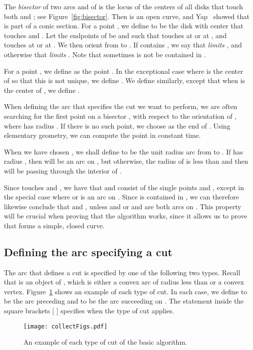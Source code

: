 \documentclass{article}
\begin{document}
The \emph{bisector}  of two arcs  and  of  is the locus of the centers of all disks that touch both  and ; see Figure~\ref{fig:bisector}.
Then  is an open curve, and Yap~\cite{yap1987ano} showed that  is part of a conic section.
For a point , we define  to be the disk with center  that touches  and .
Let the endpoints of  be  and  such that  touches  at  or  at , and  touches  at  or  at .
We then orient  from  to .
If  contains , we say that  \emph{limits} , and otherwise that  \emph{limits} .
Note that sometimes  is not be contained in .

For a point , we define  as the point .
In the exceptional case where  is the center of  so that this is not unique, we define .
We define  similarly, except that when  is the center of , we define .

When defining the arc  that specifies the cut we want to perform, we are often searching for the first point  on a bisector , with respect to the orientation of , where  has radius .
If there is no such point, we choose  as the end of .
Using elementary geometry, we can compute the point  in constant time.

When we have chosen , we shall define  to be the unit radius arc from  to .
If  has radius , then  will be an arc on , but otherwise, the radius of  is less than  and then  will be passing through the interior of .

Since  touches  and , we have that  and  consist of the single points  and , except in the special case where  or  is an arc on .
Since  is contained in , we can therefore likewise conclude that  and , unless  and  or  and  are both arcs on .
This property will be crucial when proving that the algorithm works, since it allows us to prove that  forms a simple, closed curve.

\subsection{Defining the arc  specifying a cut}\label{cutDef}

The arc  that defines a cut is specified by one of the following two types.
Recall that  is an object of , which is either a convex arc of radius less than  or a convex vertex. 
Figure~\ref{fig:cuttypesSimple} shows an example of each type of cut.
In each case, we define  to be the arc preceding  and  to be the arc succeeding  on .
The statement inside the square brackets [ ] specifies when the type of cut applies.

\begin{figure}
\centering
\texttt{[image: collectFigs.pdf]}
\caption{An example of each type of cut of the basic algorithm.}
\label{fig:cuttypesSimple}
\end{figure}
\end{document}
